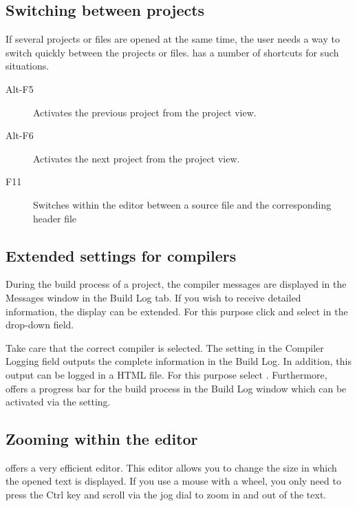 \subsection{Switching between projects}

If several projects or files are opened at the same time, the user needs a way to switch quickly between the projects or files. \codeblocks has a number of shortcuts for such situations.

\begin{description}
\item[Alt-F5] Activates the previous project from the project view.
\item[Alt-F6] Activates the next project from the project view.
\item[F11] Switches within the editor between a source file  and the corresponding header file 
\end{description}

\subsection{Extended settings for compilers}

During the build process of a project, the compiler messages are displayed in the Messages window in the Build Log tab. If you wish to receive detailed information, the display can be extended. For this purpose click  and select  in the drop-down field.


Take care that the correct compiler is selected. The  setting in the Compiler Logging field outputs the complete information in the Build Log. In addition, this output can be logged in a HTML file. For this purpose select .
Furthermore, \codeblocks offers a progress bar for the build process in the Build Log window which can be activated via the  setting.

\subsection{Zooming within the editor}

\codeblocks offers a very efficient editor. This editor allows you to change the size in which the opened text is displayed. If you use a mouse with a wheel, you only need to press the Ctrl key and scroll via the jog dial to zoom in and out of the text.


